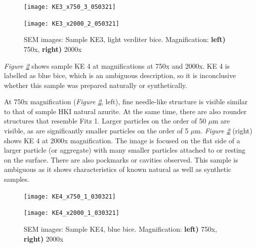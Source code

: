 \begin{figure}[H]
\centering
\begin{minipage}{.45\textwidth}
  \centering
  \texttt{[image: KE3\_x750\_3\_050321]}
\end{minipage}
\begin{minipage}{.45\textwidth}
  \centering
  \texttt{[image: KE3\_x2000\_2\_050321]}
\end{minipage}
\caption[SEM images: Sample KE3, light verditer bice]{SEM images: Sample KE3, light verditer bice. Magnification: \textbf{left)} 750x, \textbf{right)} 2000x}
\label{fig:KE3_sem_1}
\end{figure}


\textit{Figure \ref{fig:KE4_sem_1}} shows sample KE 4 at magnifications at 750x and 2000x. KE 4 is labelled as blue bice, which is an ambiguous description, so it is inconclusive whether this sample was prepared naturally or synthetically.

At 750x magnification (\textit{Figure \ref{fig:KE4_sem_1}}, left), fine needle-like structure is visible similar to that of sample HKI natural azurite. At the same time, there are also rounder structures that resemble Fitz 1. Larger particles on the order of 50 $\mu$m are visible, as are significantly smaller particles on the order of 5 $\mu$m. \textit{Figure \ref{fig:KE4_sem_1}} (right) shows KE 4 at 2000x magnification. The image is focused on the flat side of a larger particle (or aggregate) with many smaller particles attached to or resting on the surface. There are also pockmarks or cavities observed. This sample is ambiguous as it shows characteristics of known natural as well as synthetic samples.

\begin{figure}[H]
\centering
\begin{minipage}{.45\textwidth}
  \centering
  \texttt{[image: KE4\_x750\_1\_030321]}
\end{minipage}
\begin{minipage}{.45\textwidth}
  \centering
  \texttt{[image: KE4\_x2000\_1\_030321]}
\end{minipage}
\caption[SEM images: Sample KE4, blue bice]{SEM images: Sample KE4, blue bice. Magnification: \textbf{left)} 750x, \textbf{right)} 2000x}
\label{fig:KE4_sem_1}
\end{figure}


